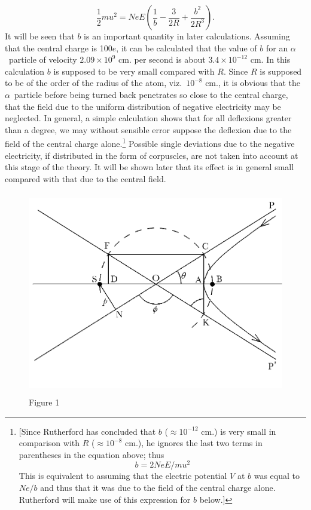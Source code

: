 \begin{equation*}
\frac{1}{2}mu^2 = NeE\left(\frac{1}{b} - \frac{3}{2R} + \frac{b^2}{2R^3}\right).
\end{equation*}
It will be seen that $b$ is an important quantity in later
calculations. Assuming that the central charge is 100$e$, it can be
calculated that the value of $b$ for an $\alpha$~particle of
velocity $2.09 \times 10^9$ cm. per second is about $3.4 \times 10^{-12}$ cm. In this
calculation $b$ is supposed to be very small compared with
$R$. Since $R$ is supposed to be of the order of the radius of
the atom, viz.\ $10^{-8}$ cm., it is obvious that the $\alpha$~particle before
being turned back penetrates so close to the central charge, that the
field due to the uniform distribution of negative electricity may be
neglected. In general, a simple calculation shows that for all
deflexions greater than a degree, we may without sensible error suppose
the deflexion due to the field of the central charge alone.\footnote{{[}Since
  Rutherford has concluded that $b$ ($\approx 10^{-12}$ cm.)
  is very small in comparison with $R$ ($\approx 10^{-8}$
  cm.), he ignores the last two terms in parentheses in the equation
  above; thus
  \begin{equation*}
  b = 2NeE/mu^2
  \end{equation*}
  This is equivalent to assuming that the electric potential $V$ at
  $b$ was equal to $Ne/b$ and thus that it was due to the
  field of the central charge alone. Rutherford will make use of this
  expression for $b$ below.]} Possible single deviations 
  due to the negative electricity, if distributed in the form
of corpuscles, are not taken into account at this stage of the theory.
It will be shown later that its effect is in general small compared with
that due to the central field.
%
\begin{figure}[htp]
\centering
    \includegraphics[width=4.65625in,height=3.5in]{images/04_rutherford/image005.png}
    \vspace*{-15mm}\caption*{Figure 1}
\end{figure}
%

